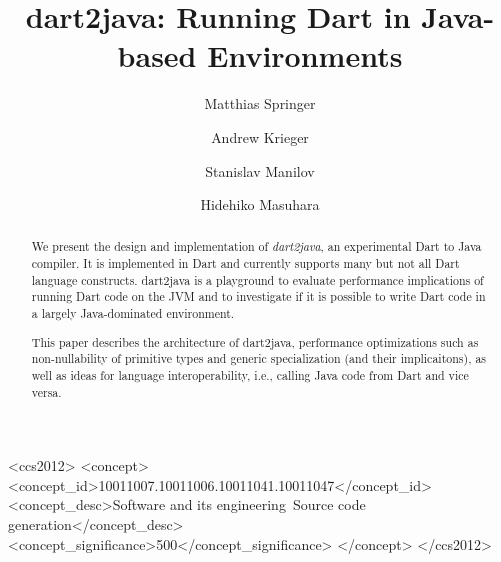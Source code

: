\documentclass[sigplan,9pt]{acmart}
\begin{document}
\title{{dart2java}: Running Dart in Java-based Environments}

\newcommand\Mark[1]{\textsuperscript#1}


\author{Matthias Springer}

\author{Andrew Krieger}

\author{Stanislav Manilov}

\author{Hidehiko Masuhara}





\begin{abstract}
We present the design and implementation of \emph{dart2java}, an experimental Dart to Java compiler. It is implemented in Dart and currently supports many but not all Dart language constructs. dart2java is a playground to evaluate performance implications of running Dart code on the JVM and to investigate if it is possible to write Dart code in a largely Java-dominated environment.

This paper describes the architecture of dart2java, performance optimizations such as non-nullability of primitive types and generic specialization (and their implicaitons), as well as ideas for language interoperability, i.e., calling Java code from Dart and vice versa.
\end{abstract}

\begin{CCSXML}
<ccs2012>
<concept>
<concept_id>10011007.10011006.10011041.10011047</concept_id>
<concept_desc>Software and its engineering~Source code generation</concept_desc>
<concept_significance>500</concept_significance>
</concept>
</ccs2012>
\end{CCSXML}
\end{document}
